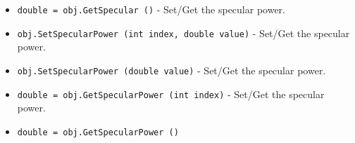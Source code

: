 \begin{itemize}
\item  \verb|double = obj.GetSpecular ()| -  Set/Get the specular power.

\item  \verb|obj.SetSpecularPower (int index, double value)| -  Set/Get the specular power.

\item  \verb|obj.SetSpecularPower (double value)| -  Set/Get the specular power.

\item  \verb|double = obj.GetSpecularPower (int index)| -  Set/Get the specular power.

\item  \verb|double = obj.GetSpecularPower ()|

\end{itemize}
